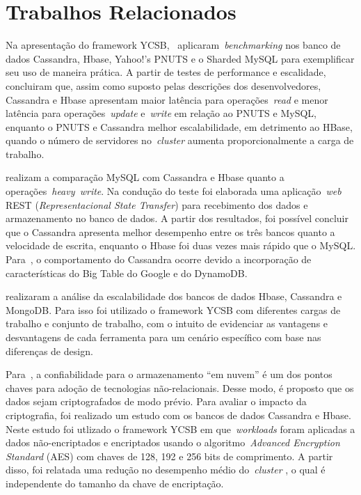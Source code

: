 \documentclass[12pt]{article}
\begin{document}

\section{Trabalhos Relacionados} 
\label{section:relacionados}

Na apresentação do framework YCSB,~\cite{cooper2010benchmarking} aplicaram~\emph{benchmarking} nos banco de dados Cassandra, Hbase, Yahoo!’s PNUTS e o Sharded MySQL para exemplificar seu uso de maneira prática. A partir de testes de performance e escalidade, concluiram que, assim como suposto pelas descrições dos desenvolvedores, Cassandra e Hbase apresentam maior latência para operações~\emph{read} e menor latência para operações~\emph{update} e~\emph{write} em relação ao PNUTS e MySQL, enquanto o PNUTS e Cassandra melhor escalabilidade, em detrimento ao HBase, quando o número de servidores no~\emph{cluster}  aumenta proporcionalmente a carga de trabalho.

\cite{jogi2016performance} realizam a comparação MySQL com Cassandra e Hbase quanto a operações~\emph{heavy~\emph{write}}. 
Na condução do teste foi elaborada uma aplicação~\emph{web} REST (\emph{Representacional State Transfer}) para recebimento dos dados e armazenamento no banco de dados. A partir dos resultados, foi possível concluir que o Cassandra apresenta melhor desempenho entre os três bancos quanto a velocidade de escrita, enquanto o Hbase foi duas vezes mais rápido que o MySQL. 
Para~\cite{jogi2016performance}, o comportamento do Cassandra ocorre devido a incorporação de características do Big Table do Google e do DynamoDB.

\cite{swaminathan2016quantitative} realizaram a análise da escalabilidade dos bancos de dados Hbase, Cassandra e MongoDB. Para isso foi utilizado o framework YCSB com diferentes cargas de trabalho e conjunto de trabalho, com o intuito de evidenciar as vantagens e desvantagens de cada ferramenta para um cenário específico com base nas diferenças de design.

Para~\cite{waage2014benchmarking}, a confiabilidade para o armazenamento ``em nuvem'' é um dos pontos chaves para adoção de tecnologias não-relacionais. Desse modo, é proposto que os dados sejam criptografados de modo prévio. Para avaliar o impacto da criptografia, foi realizado um estudo com os bancos de dados Cassandra e Hbase. 
Neste estudo foi utlizado o framework YCSB em que~\emph{workloads} foram aplicadas a dados não-encriptados e encriptados usando o algoritmo~\emph{Advanced Encryption Standard} (AES) com chaves de 128, 192 e 256 bits de comprimento. 
A partir disso, foi relatada uma redução no desempenho médio do~\emph{cluster} , o qual é independente do tamanho da chave de encriptação.
\end{document}
